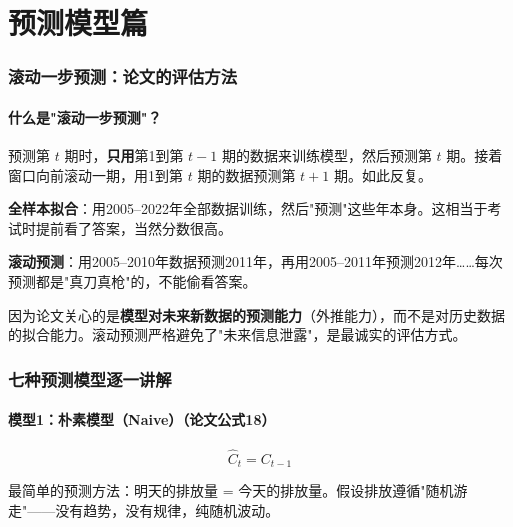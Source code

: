 \documentclass[12pt, a4paper]{article}
\begin{document}
\part{预测模型篇}

\section{滚动一步预测：论文的评估方法}

\subsection{什么是"滚动一步预测"？}

\begin{conceptbox}[滚动一步向前预测]
预测第 $t$ 期时，\textbf{只用}第1到第 $t-1$ 期的数据来训练模型，然后预测第 $t$ 期。接着窗口向前滚动一期，用1到第 $t$ 期的数据预测第 $t+1$ 期。如此反复。
\end{conceptbox}

\begin{examplebox}
\textbf{全样本拟合}：用2005--2022年全部数据训练，然后"预测"这些年本身。这相当于考试时提前看了答案，当然分数很高。

\textbf{滚动预测}：用2005--2010年数据预测2011年，再用2005--2011年预测2012年……每次预测都是"真刀真枪"的，不能偷看答案。
\end{examplebox}

\begin{tipbox}[为什么论文选择滚动预测？]
因为论文关心的是\textbf{模型对未来新数据的预测能力}（外推能力），而不是对历史数据的拟合能力。滚动预测严格避免了"未来信息泄露"，是最诚实的评估方式。
\end{tipbox}

\section{七种预测模型逐一讲解}

\subsection{模型1：朴素模型（Naive）（论文公式18）}

\[
\hat{C}_t = C_{t-1}
\]

\begin{conceptbox}[朴素模型]
最简单的预测方法：明天的排放量 = 今天的排放量。假设排放遵循"随机游走"——没有趋势，没有规律，纯随机波动。
\end{conceptbox}
\end{document}
